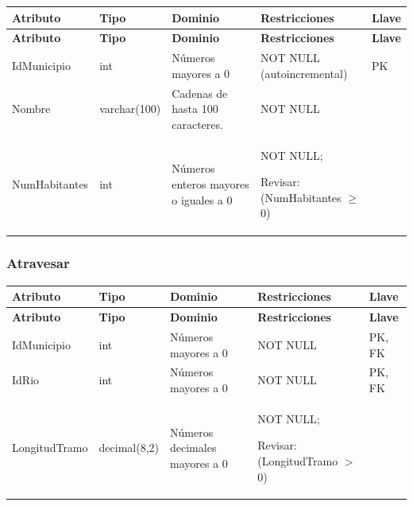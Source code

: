 \begin{longtable}{p{2.7cm} p{2.2cm} p{4.8cm} p{4.2cm} p{1.5cm}}
\toprule
\textbf{Atributo} & \textbf{Tipo} & \textbf{Dominio} & \textbf{Restricciones} & \textbf{Llave} \\
\midrule
\endfirsthead

\toprule
\textbf{Atributo} & \textbf{Tipo} & \textbf{Dominio} & \textbf{Restricciones} & \textbf{Llave} \\
\midrule
\endhead

\bottomrule
\endfoot


IdMunicipio
& int
& Números mayores a 0
& NOT NULL (autoincremental)
& PK \\

Nombre
& varchar(100)
& Cadenas de hasta 100 caracteres.
& NOT NULL
&  \\

NumHabitantes
& int
& Números enteros mayores o iguales a 0
& NOT NULL;

Revisar: (NumHabitantes $\geq$ 0)
&  \\

\end{longtable}


\subsubsection*{Atravesar}

\begin{longtable}{p{2.6cm} p{2.2cm} p{5.8cm} p{4.2cm} p{1.5cm}}
\toprule
\textbf{Atributo} & \textbf{Tipo} & \textbf{Dominio} & \textbf{Restricciones} & \textbf{Llave} \\
\midrule
\endfirsthead

\toprule
\textbf{Atributo} & \textbf{Tipo} & \textbf{Dominio} & \textbf{Restricciones} & \textbf{Llave} \\
\midrule
\endhead

\bottomrule
\endfoot


IdMunicipio
& int
& Números mayores a 0
& NOT NULL
& PK, FK \\

IdRio
& int
& Números mayores a 0
& NOT NULL
& PK, FK \\

LongitudTramo
& decimal(8,2)
& Números decimales mayores a 0
& NOT NULL;

Revisar: (LongitudTramo $>$ 0)
&  \\

\end{longtable}


